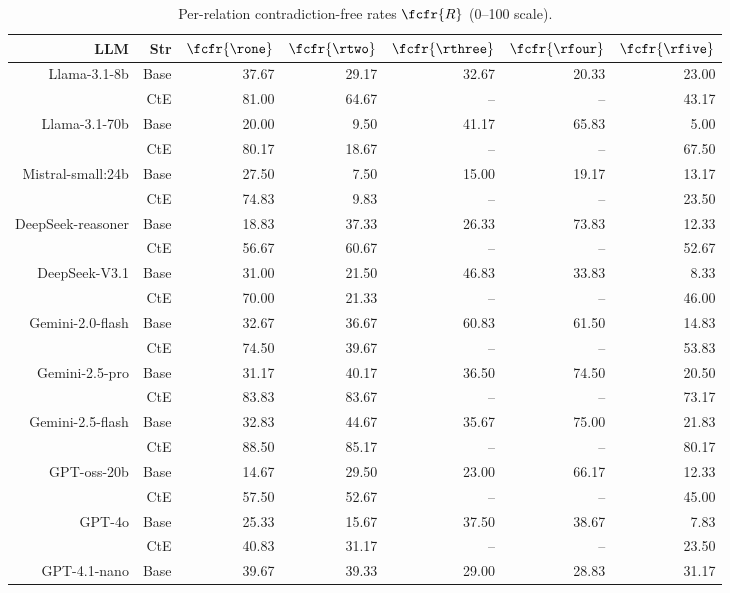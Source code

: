 \begin{table}[!t]
\caption{Per-relation contradiction-free rates $\fcfr{R}$ (0--100 scale). }
\centering
{}

\footnotesize
\begin{tabular}{r r !{\color{white!80!black} \vline} r r r r r}
\toprule
\textbf{LLM} & \textbf{Str} & $\fcfr{\rone}$ & $\fcfr{\rtwo}$ & $\fcfr{\rthree}$ & $\fcfr{\rfour}$ & $\fcfr{\rfive}$ \\
\midrule
\sf Llama-3.1-8b & Base & 37.67 & 29.17 & 32.67 & 20.33 & 23.00 \\
 & CtE & 81.00 & 64.67 & -- & -- & 43.17 \\
\midrule
\sf Llama-3.1-70b & Base & 20.00 & 9.50 & 41.17 & 65.83 & 5.00 \\
 & CtE & 80.17 & 18.67 & -- & -- & 67.50 \\
\midrule
\sf Mistral-small:24b & Base & 27.50 & 7.50 & 15.00 & 19.17 & 13.17 \\
 & CtE & 74.83 & 9.83 & -- & -- & 23.50 \\
\midrule
\sf DeepSeek-reasoner & Base & 18.83 & 37.33 & 26.33 & 73.83 & 12.33 \\
 & CtE & 56.67 & 60.67 & -- & -- & 52.67 \\
\midrule
\sf DeepSeek-V3.1 & Base & 31.00 & 21.50 & 46.83 & 33.83 & 8.33 \\
 & CtE & 70.00 & 21.33 & -- & -- & 46.00 \\
\midrule
\sf Gemini-2.0-flash & Base & 32.67 & 36.67 & 60.83 & 61.50 & 14.83 \\
 & CtE & 74.50 & 39.67 & -- & -- & 53.83 \\
\midrule
\sf Gemini-2.5-pro & Base & 31.17 & 40.17 & 36.50 & 74.50 & 20.50 \\
 & CtE & 83.83 & 83.67 & -- & -- & 73.17 \\
\midrule
\sf Gemini-2.5-flash & Base & 32.83 & 44.67 & 35.67 & 75.00 & 21.83 \\
 & CtE & 88.50 & 85.17 & -- & -- & 80.17 \\
\midrule
\sf GPT-oss-20b & Base & 14.67 & 29.50 & 23.00 & 66.17 & 12.33 \\
 & CtE & 57.50 & 52.67 & -- & -- & 45.00 \\
\midrule
\sf GPT-4o & Base & 25.33 & 15.67 & 37.50 & 38.67 & 7.83 \\
 & CtE & 40.83 & 31.17 & -- & -- & 23.50 \\
\midrule
\sf GPT-4.1-nano & Base & 39.67 & 39.33 & 29.00 & 28.83 & 31.17 \\

\end{tabular}
\end{table}
